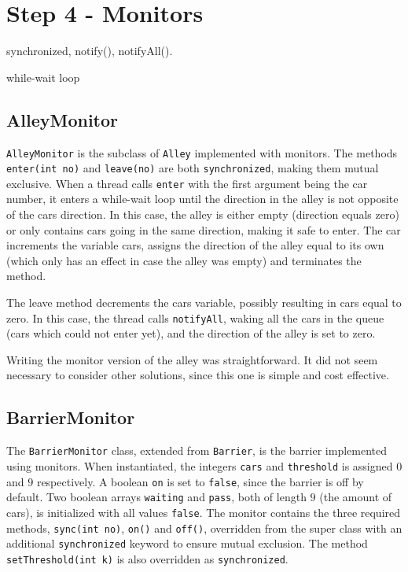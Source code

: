 \section*{Step 4 - Monitors}
synchronized, notify(), notifyAll().

while-wait loop
\subsection{AlleyMonitor}
\texttt{AlleyMonitor} is the subclass of \texttt{Alley} implemented with monitors. The methods \texttt{enter(int no)} and \texttt{leave(no)} are both \texttt{synchronized}, making them mutual exclusive. When a thread calls \texttt{enter} with the first argument being the car number, it enters a while-wait loop until the direction in the alley is not opposite of the cars direction. In this case, the alley is either empty (direction equals zero) or only contains cars going in the same direction, making it safe to enter. The car increments the variable cars, assigns the direction of the alley equal to its own (which only has an effect in case the alley was empty) and terminates the method.

The leave method decrements the cars variable, possibly resulting in cars equal to zero. In this case, the thread calls \texttt{notifyAll}, waking all the cars in the queue (cars which could not enter yet), and the direction of the alley is set to zero.

Writing the monitor version of the alley was straightforward. It did not seem necessary to consider other solutions, since this one is simple and cost effective.

\subsection*{BarrierMonitor}
The \texttt{BarrierMonitor} class, extended from \texttt{Barrier}, is the barrier implemented using monitors. When instantiated, the integers \texttt{cars} and \texttt{threshold} is assigned $0$ and $9$ respectively. A boolean \texttt{on} is set to \texttt{false}, since the barrier is off by default. Two boolean arrays \texttt{waiting} and \texttt{pass}, both of length $9$ (the amount of cars), is initialized with all values \texttt{false}. The monitor contains the three required methods, \texttt{sync(int no)}, \texttt{on()} and \texttt{off()}, overridden from the super class with an additional \texttt{synchronized} keyword to ensure mutual exclusion. The method \texttt{setThreshold(int k)} is also overridden as \texttt{synchronized}.

